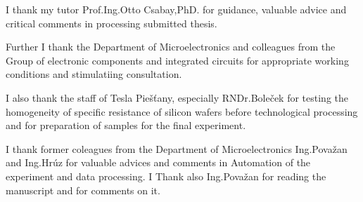 \iffalse
\par Ďakujem svojmu školiteľovi Prof. Ing. Ottovi Csabayovi, DrSc. za
usmerňovanie, cenné rady a kritické pripomienky pri spracovaní
predloženej kandidátskej práce.
\par Ďakujem ďalej vedeniu Katedry mikroelektroniky a kolegom z
Oddelenia elektronických prvkov a integrovaných obvodov za vytvorené
pracovné podmienky a podnetné konzultácie.
\par Ďakujem tiež pracovníkom Tesly Piešťany, najmä RNDr.Bolečkovi za
otestovanie homogenity špecifického odporu kremíkových dosiek pred
technologickým spracovaním a za prípravu vzoriek pre záverečný
experiment.
\par Ďakujem bývalým pracovníkom Katedry mikroelektroniky
Ing.Považanovi a Ing.Hrúzovi za cenné rady a pripomienky v oblasti
automatizácie experimentu a spracovania dát. Ing.Považanovi ďakujem aj
za prečítanie práce a pripomienky k nej.
\fi

\par
I thank my tutor Prof.Ing.Otto Csabay,PhD. for guidance, valuable
advice and critical comments in processing submitted thesis.

\par
Further I thank the Department of Microelectronics and colleagues from
the Group of electronic components and integrated circuits for
appropriate working conditions and stimulatiing consultation.

\par
I also thank the staff of Tesla Piešťany, especially RNDr.Boleček for
testing the homogeneity of specific resistance of silicon wafers
before technological processing and for preparation of samples for the
final experiment.

\par
I thank former coleagues from the Department of Microelectronics
Ing.Považan and Ing.Hrúz for valuable advices and comments in
Automation of the experiment and data processing. I Thank also
Ing.Považan for reading the manuscript and for comments on it.
